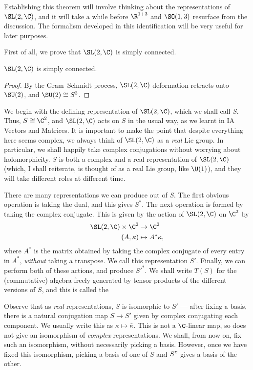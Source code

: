 \documentclass[a4paper]{article}
\begin{document}
Establishing this theorem will involve thinking about the representations of $\SL(2, \C)$, and it will take a while before $\R^{1 + 3}$ and $\SO(1, 3)$ resurface from the discussion. The formalism developed in this identification will be very useful for later purposes.

First of all, we prove that $\SL(2, \C)$ is simply connected.
\begin{prop}
  $\SL(2, \C)$ is simply connected.
\end{prop}

\begin{proof}
  By the Gram--Schmidt process, $\SL(2, \C)$ deformation retracts onto $\SU(2)$, and $\SU(2) \cong S^3$.
\end{proof}

We begin with the defining representation of $\SL(2, \C)$, which we shall call $S$. Thus, $S \cong \C^2$, and $\SL(2, \C)$ acts on $S$ in the usual way, as we learnt in IA Vectors and Matrices. It is important to make the point that despite everything here seems complex, we always think of $\SL(2, \C)$ as a \emph{real} Lie group. In particular, we shall happily take complex conjugations without worrying about holomorphicity. $S$ is both a complex and a real representation of $\SL(2, \C)$ (which, I shall reiterate, is thought of as a real Lie group, like $\U(1)$), and they will take different roles at different time.

There are many representations we can produce out of $S$. The first obvious operation is taking the dual, and this gives $S^*$. The next operation is formed by taking the complex conjugate. This is given by the action of $\SL(2, \C)$ on $\C^2$ by
\begin{align*}
  \SL(2, \C) \times \C^2 &\to \C^2\\
  (A, \kappa) &\mapsto A^* \kappa,
\end{align*}
where $A^*$ is the matrix obtained by taking the complex conjugate of every entry in $A^*$, \emph{without} taking a transpose. We call this representation $S'$. Finally, we can perform both of these actions, and produce $S'^*$. We shall write $T(S)$ for the (commutative) algebra freely generated by tensor products of the different versions of $S$, and this is called the 

Observe that as \emph{real} representations, $S$ is isomorphic to $S'$ --- after fixing a basis, there is a natural conjugation map $S \to S'$ given by complex conjugating each component. We usually write this as $\kappa \mapsto \bar{\kappa}$. This is not a $\C$-linear map, so does not give an isomorphism of \emph{complex} representations. We shall, from now on, fix such an isomorphism, without necessarily picking a basis. However, once we have fixed this isomorphism, picking a basis of one of $S$ and $S"$ gives a basis of the other.
\end{document}
